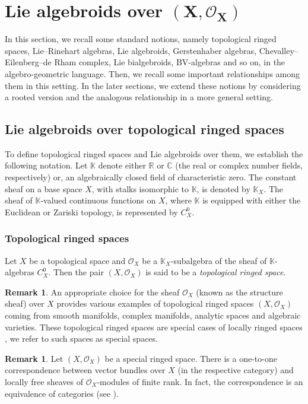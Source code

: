 \documentclass[pdftex]{sigma}
\numberwithin{equation}{section}
\theoremstyle{definition}
\newtheorem{Rem}[Thm]{Remark}
\begin{document}
\section[Lie algebroids over (X,O\_X)]{Lie algebroids over $\boldsymbol{(X, \mathcal{O}_X)}$} \label{Sec 2}

In this section, we recall some standard notions, namely topological ringed spaces, Lie--Rinehart algebras, Lie algebroids, Gerstenhaber algebras, Chevalley--Eilenberg--de Rham complex, Lie bialgebroids, BV-algebras and so on, in the algebro-geometric language. Then, we recall some important relationships among them in this setting. In the later sections, we extend these notions by considering a rooted version and the analogous relationship in a more general setting.

\subsection{Lie algebroids over topological ringed spaces}
To define topological ringed spaces and Lie algebroids over them, we establish the following notation. Let $\mathbb{K}$ denote either $\mathbb{R}$ or $\mathbb{C}$ (the real or complex number fields, respectively) or, an algebraically closed field of characteristic zero. The constant sheaf on a base space $X$, with stalks isomorphic to $\mathbb{K}$, is denoted by $\mathbb{K}_X$. The sheaf of $\mathbb{K}$-valued continuous functions on $X$, where $\mathbb{K}$ is equipped with either the Euclidean or Zariski topology, is represented by $C_X^0$.

\subsubsection{Topological ringed spaces}
Let $X$ be a topological space and $\mathcal{O}_X$ be a $\mathbb{K}_X$-subalgebra of the sheaf of $\mathbb{K}$-algebras $C_X^0$.
Then the pair $(X, \mathcal{O}_X)$ is said to be a \emph{topological ringed space}.

\begin{Rem} \label{special spaces}
	An appropriate choice for the sheaf $\mathcal{O}_X$ (known as the structure sheaf) over $X$ provides various examples of topological ringed spaces $(X, \mathcal{O}_X)$ coming from smooth manifolds, complex manifolds, analytic spaces and algebraic varieties. These topological ringed spaces are special cases of locally ringed spaces \cite{CW}, we refer to such spaces as special spaces.
\end{Rem}
\begin{Rem} \label{Vec bun & loc free}
	Let $(X, \mathcal{O}_X)$ be a special ringed space. There is a one-to-one correspondence between vector bundles over $X$ (in the respective category) and locally free sheaves of $\mathcal{O}_X$\nobreakdash-modules of finite rank. In fact, the correspondence is an equivalence of categories (see \cite{BP, SR, CW}).
\end{Rem}	
\end{document}
